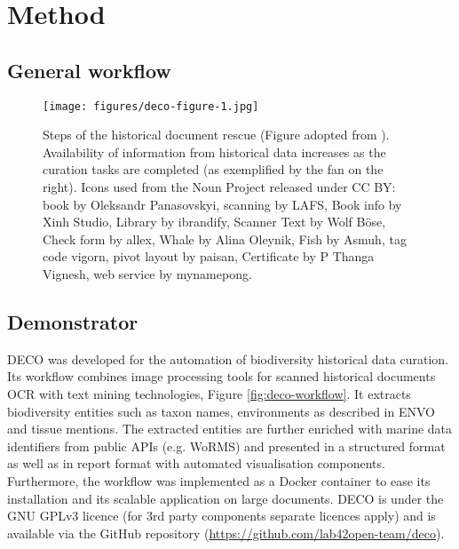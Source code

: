 \section{Method}
\label{sec:deco-method}

\subsection{General workflow}


   \begin{figure}[htp!]
      \centering
      \texttt{[image: figures/deco-figure-1.jpg]}
      \caption[Historical document rescue process]{Steps of the historical document rescue (Figure adopted from \parencite{Paragkamian2022}).
      Availability of information from historical data increases as the curation tasks are completed (as exemplified by the fan on the right).
  Icons used from the Noun Project released under CC BY: book by Oleksandr Panasovskyi, scanning by LAFS, Book info by Xinh Studio, Library by ibrandify, Scanner Text by Wolf Böse, Check form by allex, Whale by Alina Oleynik, Fish by Asmuh, tag code vigorn, pivot layout by paisan, Certificate by P Thanga Vignesh, web service by mynamepong.}
      \label{fig:rescue-workflow}
   \end{figure}


    \subsection{Demonstrator}

DECO was developed for the automation of biodiversity historical data
curation. Its workflow combines image processing tools for scanned historical
documents OCR with text mining technologies, Figure \ref{fig:deco-workflow}. It extracts biodiversity entities
such as taxon names, environments as described in ENVO and tissue mentions.
The extracted entities are further enriched with marine data identifiers from
public APIs (e.g. WoRMS) and presented in a structured format as well as in
report format with automated visualisation components. Furthermore, the
workflow was implemented as a Docker container to ease its installation and its
scalable application on large documents. DECO is under the GNU GPLv3 licence
(for 3rd party components separate licences apply) and is available via the
GitHub repository (\url{https://github.com/lab42open-team/deco}).

